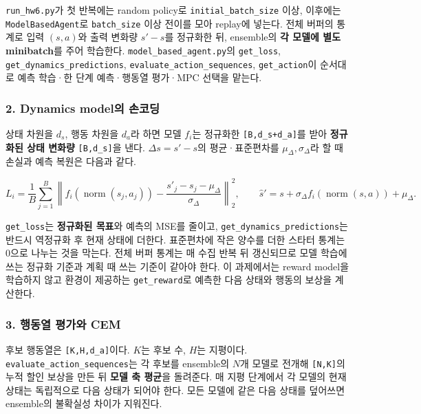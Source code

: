 \documentclass[11pt,a4paper]{article}
\begin{document}
\texttt{run\_\allowbreak{}hw6.\allowbreak{}py}가 첫 반복에는 random policy로 \texttt{initial\_\allowbreak{}batch\_\allowbreak{}size} 이상, 이후에는 \texttt{ModelBasedAgent}로 \texttt{batch\_\allowbreak{}size} 이상 전이를 모아 replay에 넣는다. 전체 버퍼의 통계로 입력 $(s,a)$와 출력 변화량 $s'-s$를 정규화한 뒤, ensemble의 \textbf{각 모델에 별도 minibatch}를 주어 학습한다. \texttt{model\_\allowbreak{}based\_\allowbreak{}agent.\allowbreak{}py}의 \texttt{get\_\allowbreak{}loss}, \texttt{get\_\allowbreak{}dynamics\_\allowbreak{}predictions}, \texttt{evaluate\_\allowbreak{}action\_\allowbreak{}sequences}, \texttt{get\_\allowbreak{}action}이 순서대로 예측 학습·한 단계 예측·행동열 평가·MPC 선택을 맡는다.\par

\subsubsection{2. Dynamics model의 손코딩}

상태 차원을 $d_s$, 행동 차원을 $d_a$라 하면 모델 $f_i$는 정규화한 \texttt{[B,\allowbreak{}d\_\allowbreak{}s+d\_\allowbreak{}a]}를 받아 \textbf{정규화된 상태 변화량} \texttt{[B,\allowbreak{}d\_\allowbreak{}s]}을 낸다. $\Delta s=s'-s$의 평균·표준편차를 $\mu_\Delta,\sigma_\Delta$라 할 때 손실과 예측 복원은 다음과 같다.\par

\[
L_i=\frac1B\sum_{j=1}^B\left\|f_i(\operatorname{norm}(s_j,a_j))-
\frac{s'_j-s_j-\mu_\Delta}{\sigma_\Delta}\right\|_2^2,
\qquad \hat s'=s+\sigma_\Delta f_i(\operatorname{norm}(s,a))+\mu_\Delta.
\]

\texttt{get\_\allowbreak{}loss}는 \textbf{정규화된 목표}와 예측의 MSE를 줄이고, \texttt{get\_\allowbreak{}dynamics\_\allowbreak{}predictions}는 반드시 역정규화 후 현재 상태에 더한다. 표준편차에 작은 양수를 더한 스타터 통계는 0으로 나누는 것을 막는다. 전체 버퍼 통계는 매 수집 반복 뒤 갱신되므로 모델 학습에 쓰는 정규화 기준과 계획 때 쓰는 기준이 같아야 한다. 이 과제에서는 reward model을 학습하지 않고 환경이 제공하는 \texttt{get\_\allowbreak{}reward}로 예측한 다음 상태와 행동의 보상을 계산한다.\par

\subsubsection{3. 행동열 평가와 CEM}

후보 행동열은 \texttt{[K,\allowbreak{}H,\allowbreak{}d\_\allowbreak{}a]}이다. $K$는 후보 수, $H$는 지평이다. \texttt{evaluate\_\allowbreak{}action\_\allowbreak{}sequences}는 각 후보를 ensemble의 $N$개 모델로 전개해 \texttt{[N,\allowbreak{}K]}의 누적 할인 보상을 만든 뒤 \textbf{모델 축 평균}을 돌려준다. 매 지평 단계에서 각 모델의 현재 상태는 독립적으로 다음 상태가 되어야 한다. 모든 모델에 같은 다음 상태를 덮어쓰면 ensemble의 불확실성 차이가 지워진다.\par
\end{document}
